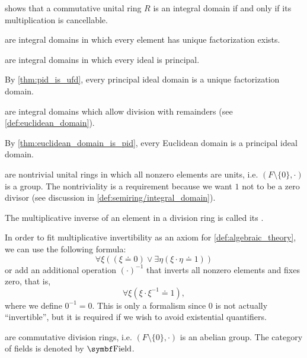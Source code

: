 \begin{definition}
\begin{defenum}
     shows that a commutative unital ring \( R \) is an integral domain if and only if its multiplication is cancellable.

      are integral domains in which every element has unique factorization exists.

      are integral domains in which every ideal is principal.

    By \cref{thm:pid_is_ufd}, every principal ideal domain is a unique factorization domain.

      are integral domains which allow division with remainders (see \cref{def:euclidean_domain}).

    By \cref{thm:euclidean_domain_is_pid}, every Euclidean domain is a principal ideal domain.

      are nontrivial unital rings in which all nonzero elements are units, i.e. \( (F \setminus \{ 0 \}, \cdot) \) is a group. The nontriviality is a requirement because we want \( 1 \) not to be a zero divisor (see discussion in \cref{def:semiring/integral_domain}).

    The multiplicative inverse of an element in a division ring is called its .

    In order to fit multiplicative invertibility as an axiom for \cref{def:algebraic_theory}, we can use the following formula:
    \begin{equation*}
      \forall \xi ((\xi \doteq 0) \lor \exists \eta (\xi \cdot \eta \doteq 1))
    \end{equation*}
    or add an additional operation \( (\cdot)^{-1} \) that inverts all nonzero elements and fixes zero, that is,
    \begin{equation*}
      \forall \xi (\xi \cdot \xi^{-1} \doteq 1),
    \end{equation*}
    where we define \( 0^{-1} = 0 \). This is only a formalism since \( 0 \) is not actually \enquote{invertible}, but it is required if we wish to avoid existential quantifiers.

      are commutative division rings, i.e. \( (F \setminus \{ 0 \}, \cdot) \) is an abelian group. The category of fields is denoted by \( \Cat{Field} \).
  \end{defenum}
\end{definition}

